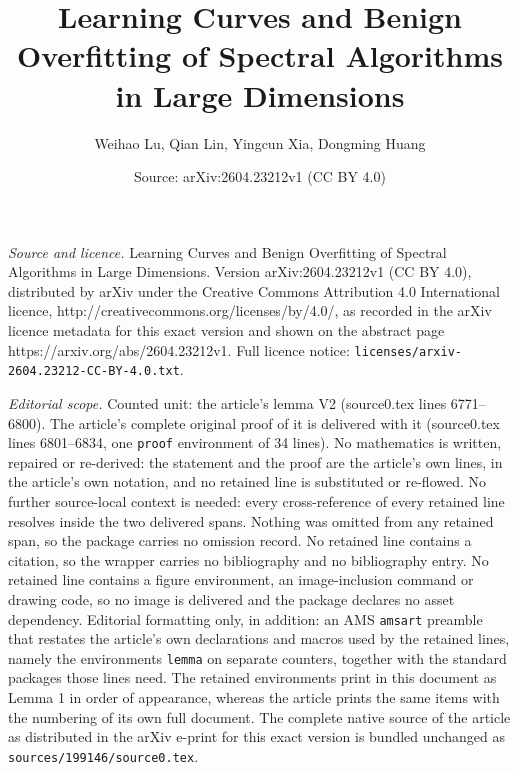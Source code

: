 \documentclass[10pt,a4paper]{amsart}
\title{Learning Curves and Benign Overfitting of Spectral Algorithms in Large Dimensions}
\author{Weihao Lu, Qian Lin, Yingcun Xia, Dongming Huang}
\date{Source: arXiv:2604.23212v1 (CC BY 4.0)}
\begin{document}
\maketitle

\noindent\emph{Source and licence.} Learning Curves and Benign Overfitting of Spectral Algorithms in Large Dimensions. Version arXiv:2604.23212v1 (CC BY 4.0), distributed by arXiv under the Creative Commons Attribution 4.0 International licence, http://creativecommons.org/licenses/by/4.0/, as recorded in the arXiv licence metadata for this exact version and shown on the abstract page https://arxiv.org/abs/2604.23212v1. Full licence notice: \texttt{licenses/arxiv-2604.23212-CC-BY-4.0.txt}.\par\smallskip

\noindent\textit{Editorial scope.} Counted unit: the article's lemma V2 (source0.tex lines 6771--6800). The article's complete original proof of it is delivered with it (source0.tex lines 6801--6834, one \texttt{proof} environment of 34 lines). No mathematics is written, repaired or re-derived: the statement and the proof are the article's own lines, in the article's own notation, and no retained line is substituted or re-flowed.  No further source-local context is needed: every cross-reference of every retained line resolves inside the two delivered spans.  Nothing was omitted from any retained span, so the package carries no omission record.  No retained line contains a citation, so the wrapper carries no bibliography and no bibliography entry.  No retained line contains a figure environment, an image-inclusion command or drawing code, so no image is delivered and the package declares no asset dependency.  Editorial formatting only, in addition: an AMS \texttt{amsart} preamble that restates the article's own declarations and macros used by the retained lines, namely the environments \texttt{lemma} on separate counters, together with the standard packages those lines need.  The retained environments print in this document as Lemma 1 in order of appearance, whereas the article prints the same items with the numbering of its own full document.  The complete native source of the article as distributed in the arXiv e-print for this exact version is bundled unchanged as \texttt{sources/199146/source0.tex}.
\end{document}
